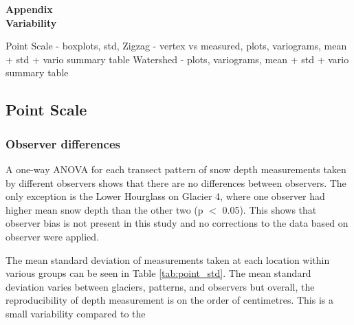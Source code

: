 \documentclass[12pt]{article}
\begin{document}

\begin{center}
\Large \textbf{Appendix\\ Variability}
\end{center}

Point Scale
- boxplots, std, 
Zigzag
- vertex vs measured, plots, variograms, mean + std + vario summary table
Watershed
- plots, variograms, mean + std + vario summary table


\subsection*{Point Scale}

\subsubsection*{Observer differences}

A one-way ANOVA for each transect pattern of snow depth measurements taken by different observers  shows that there are no differences between observers. The only exception is the Lower Hourglass on Glacier 4, where one observer had higher mean snow depth than the other two (p $<$ 0.05). This shows that observer bias is not present in this study and no corrections to the data based on observer were applied.

 The mean standard deviation of measurements taken at each location within various groups can be seen in Table \ref{tab:point_std}. The mean standard deviation varies between glaciers, patterns, and observers but overall, the reproducibility of depth measurement is on the order of centimetres. This is a small variability compared to the  
\end{document}
